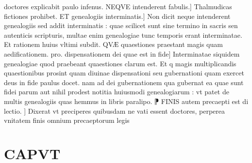 \documentclass{article}
\begin{document}
\begin{pages}
doctores explicabit paulo infenus. NEQVE intenderent fabulis.] Thalmudicas fictiones prohibet. ET genealogiis interminatis.] Non dicit neque  intenderent genealogiis  sed addit interminatis : quae scilicet sunt sine termino in sacris sen autenticis scripturis, multae enim genealogiae tunc temporis erant interminatae. Et rationem huius vltimi subdit. QVÆ quaestiones praestant magis quam aedificationem. pro. dispensationem  dei quae est in fide] Interminatae siquidem genealogiae quod praebeant quaestiones  clarum est. Et q magis multiplicandis quaestionibus prosint quam diuinae dispensationi seu gubernationi quam exercet deus in fide  paulus docet. nam ad dei gubernationem qua gubernat ea quae sunt fidei  parum aut nihil prodest notitia huiusmodi genealogiarum : vt patet de multis genealogiis quas hemmus in libris paralipo. ⁋ FINIS autem precaepti est di lectio. ] Dixerat vt preciperes quibusdam ne vati essent doctores, perperea vnitatem finis omnium precaeptorum legis  \pend
\section*{CAPVT }

\end{pages}
\end{document}
